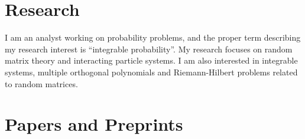 \section*{Research }

I am an analyst working on probability problems, and the proper term describing my research interest is ``integrable probability''. My research focuses on random matrix theory and interacting particle systems. I am also interested in integrable systems, multiple orthogonal polynomials and Riemann-Hilbert problems related to random matrices.




\section*{Papers and Preprints }

